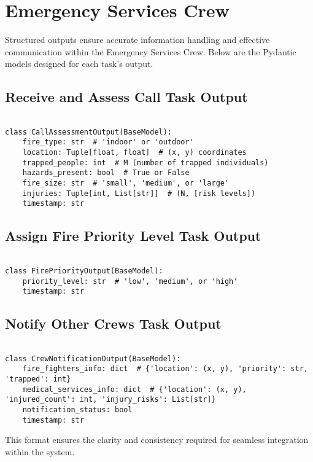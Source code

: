 \section{Emergency Services Crew}

Structured outputs ensure accurate information handling and effective communication within the Emergency Services Crew. 
Below are the Pydantic models designed for each task's output.

\subsection{Receive and Assess Call Task Output}

\begin{verbatim}

class CallAssessmentOutput(BaseModel):
    fire_type: str  # 'indoor' or 'outdoor'
    location: Tuple[float, float]  # (x, y) coordinates
    trapped_people: int  # M (number of trapped individuals)
    hazards_present: bool  # True or False
    fire_size: str  # 'small', 'medium', or 'large'
    injuries: Tuple[int, List[str]]  # (N, [risk levels])
    timestamp: str
\end{verbatim}

\subsection{Assign Fire Priority Level Task Output}

\begin{verbatim}

class FirePriorityOutput(BaseModel):
    priority_level: str  # 'low', 'medium', or 'high'
    timestamp: str
\end{verbatim}

\subsection{Notify Other Crews Task Output}

\begin{verbatim}

class CrewNotificationOutput(BaseModel):
    fire_fighters_info: dict  # {'location': (x, y), 'priority': str, 'trapped': int}
    medical_services_info: dict  # {'location': (x, y), 'injured_count': int, 'injury_risks': List[str]}
    notification_status: bool
    timestamp: str
\end{verbatim}

This format ensures the clarity and consistency required for seamless integration within the system.
